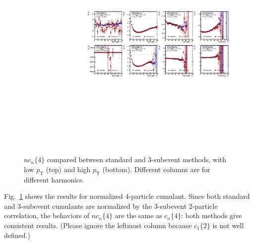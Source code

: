 \begin{figure}[H]
\centering
\includegraphics[width=.95\linewidth]{figs/sec_result/forQM/mtd_nc4.pdf}
\caption{$nc_n\{4\}$ compared between standard and 3-subevent methods, with low $p_\text{T}$ (top) and high $p_\text{T}$ (bottom). Different columns are for different harmonics.}
\label{fig:result_mtd_nc4}
\end{figure}
Fig.~\ref{fig:result_mtd_nc4} shows the results for normalized 4-particle cumulant. Since both standard and 3-subevent cumulants are normalized by the 3-subevent 2-particle correlation, the behaviors of $nc_n\{4\}$ are the same as $c_n\{4\}$: both methods give consistent results. (Please ignore the leftmost column because $c_1\{2\}$ is not well defined.)

